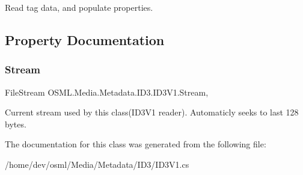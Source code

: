 Read tag data, and populate properties. 



\subsection{Property Documentation}
\mbox{\label{classOSML_1_1Media_1_1Metadata_1_1ID3_1_1ID3V1_ab7592858c878b44cbefa12b86dd91375}} 
\subsubsection{\texorpdfstring{Stream}{Stream}}
{\footnotesize\ttfamily File\+Stream O\+S\+M\+L.\+Media.\+Metadata.\+I\+D3.\+I\+D3\+V1.\+Stream\hspace{0.3cm}{\ttfamily [get]}, {\ttfamily [set]}}



Current stream used by this class(\+I\+D3\+V1 reader). Automaticly seeks to last 128 bytes. 



The documentation for this class was generated from the following file\+:\begin{DoxyCompactItemize}
\item 
/home/dev/osml/\+Media/\+Metadata/\+I\+D3/I\+D3\+V1.\+cs\end{DoxyCompactItemize}
